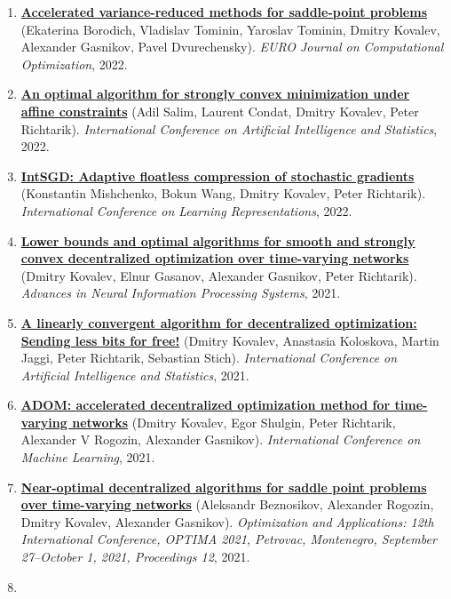 \begin{enumerate}
\item
\textbf{\href{http://crm-en.ics.org.ru/uploads/crmissues/crm_2023_02/22_tominin.pdf}{Accelerated variance-reduced methods for saddle-point problems}} (Ekaterina Borodich, Vladislav Tominin, Yaroslav Tominin, Dmitry Kovalev, Alexander Gasnikov, Pavel Dvurechensky). \textit{EURO Journal on Computational Optimization}, 2022.
\item
\textbf{\href{https://proceedings.mlr.press/v151/salim22a.html}{An optimal algorithm for strongly convex minimization under affine constraints}} (Adil Salim, Laurent Condat, Dmitry Kovalev, Peter Richtarik). \textit{International Conference on Artificial Intelligence and Statistics}, 2022.
\item
\textbf{\href{https://arxiv.org/abs/2102.08374}{IntSGD: Adaptive floatless compression of stochastic gradients}} (Konstantin Mishchenko, Bokun Wang, Dmitry Kovalev, Peter Richtarik). \textit{International Conference on Learning Representations}, 2022.
\item
\textbf{\href{https://proceedings.neurips.cc/paper/2021/hash/bc37e109d92bdc1ea71da6c919d54907-Abstract.html}{Lower bounds and optimal algorithms for smooth and strongly convex decentralized optimization over time-varying networks}} (Dmitry Kovalev, Elnur Gasanov, Alexander Gasnikov, Peter Richtarik). \textit{Advances in Neural Information Processing Systems}, 2021.
\item
\textbf{\href{https://proceedings.mlr.press/v130/kovalev21a.html}{A linearly convergent algorithm for decentralized optimization: Sending less bits for free!}} (Dmitry Kovalev, Anastasia Koloskova, Martin Jaggi, Peter Richtarik, Sebastian Stich). \textit{International Conference on Artificial Intelligence and Statistics}, 2021.
\item
\textbf{\href{http://proceedings.mlr.press/v139/kovalev21a}{ADOM: accelerated decentralized optimization method for time-varying networks}} (Dmitry Kovalev, Egor Shulgin, Peter Richtarik, Alexander V Rogozin, Alexander Gasnikov). \textit{International Conference on Machine Learning}, 2021.
\item
\textbf{\href{https://link.springer.com/chapter/10.1007/978-3-030-91059-4_18}{Near-optimal decentralized algorithms for saddle point problems over time-varying networks}} (Aleksandr Beznosikov, Alexander Rogozin, Dmitry Kovalev, Alexander Gasnikov). \textit{Optimization and Applications: 12th International Conference, OPTIMA 2021, Petrovac, Montenegro, September 27–October 1, 2021, Proceedings 12}, 2021.
\item

\end{enumerate}
